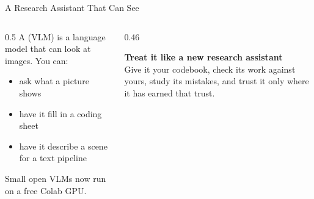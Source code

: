 \newcommand{\coursemodule}{Module 10}





\begin{frame}{A Research Assistant That Can See}
\begin{columns}[T]
\begin{column}{0.5\textwidth}
A  (VLM) is a language model that can look at images. You can:

\begin{itemize}
\item ask what a picture shows
\item have it fill in a coding sheet
\item have it describe a scene for a text pipeline
\end{itemize}

\vspace{0.15cm}
Small open VLMs now run on a free Colab GPU.
\end{column}
\begin{column}{0.46\textwidth}
\begin{greenbox}
\textbf{Treat it like a new research assistant}\\
Give it your codebook, check its work against yours, study its mistakes, and trust it only where
it has earned that trust.
\end{greenbox}
\end{column}
\end{columns}
\end{frame}

